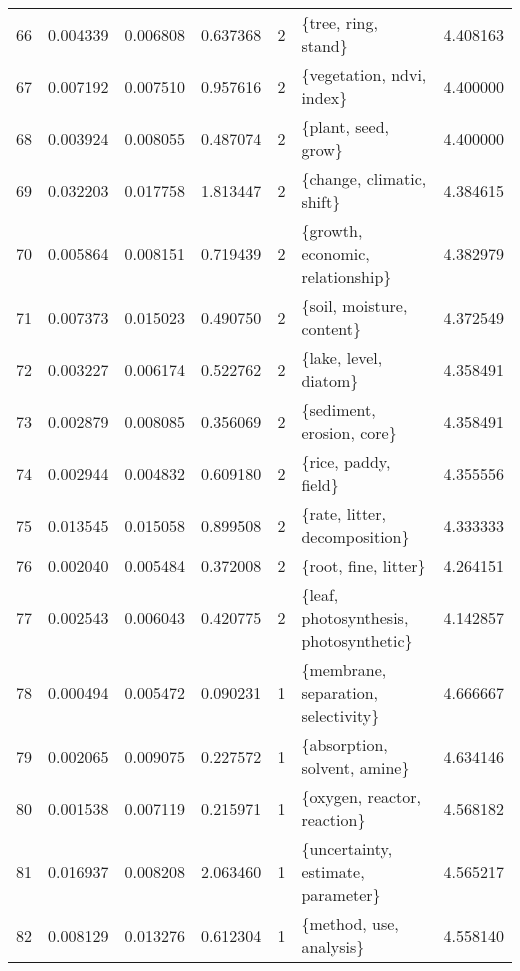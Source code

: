 \begin{tabular}{lrrrrlr}
66  &    0.004339 &  0.006808 &        0.637368 &           2 &                     \{tree, ring, stand\} &  4.408163 \\
67  &    0.007192 &  0.007510 &        0.957616 &           2 &               \{vegetation, ndvi, index\} &  4.400000 \\
68  &    0.003924 &  0.008055 &        0.487074 &           2 &                     \{plant, seed, grow\} &  4.400000 \\
69  &    0.032203 &  0.017758 &        1.813447 &           2 &               \{change, climatic, shift\} &  4.384615 \\
70  &    0.005864 &  0.008151 &        0.719439 &           2 &        \{growth, economic, relationship\} &  4.382979 \\
71  &    0.007373 &  0.015023 &        0.490750 &           2 &               \{soil, moisture, content\} &  4.372549 \\
72  &    0.003227 &  0.006174 &        0.522762 &           2 &                   \{lake, level, diatom\} &  4.358491 \\
73  &    0.002879 &  0.008085 &        0.356069 &           2 &               \{sediment, erosion, core\} &  4.358491 \\
74  &    0.002944 &  0.004832 &        0.609180 &           2 &                    \{rice, paddy, field\} &  4.355556 \\
75  &    0.013545 &  0.015058 &        0.899508 &           2 &           \{rate, litter, decomposition\} &  4.333333 \\
76  &    0.002040 &  0.005484 &        0.372008 &           2 &                    \{root, fine, litter\} &  4.264151 \\
77  &    0.002543 &  0.006043 &        0.420775 &           2 &  \{leaf, photosynthesis, photosynthetic\} &  4.142857 \\
78  &    0.000494 &  0.005472 &        0.090231 &           1 &     \{membrane, separation, selectivity\} &  4.666667 \\
79  &    0.002065 &  0.009075 &        0.227572 &           1 &            \{absorption, solvent, amine\} &  4.634146 \\
80  &    0.001538 &  0.007119 &        0.215971 &           1 &             \{oxygen, reactor, reaction\} &  4.568182 \\
81  &    0.016937 &  0.008208 &        2.063460 &           1 &      \{uncertainty, estimate, parameter\} &  4.565217 \\
82  &    0.008129 &  0.013276 &        0.612304 &           1 &                 \{method, use, analysis\} &  4.558140 \\

\end{tabular}
